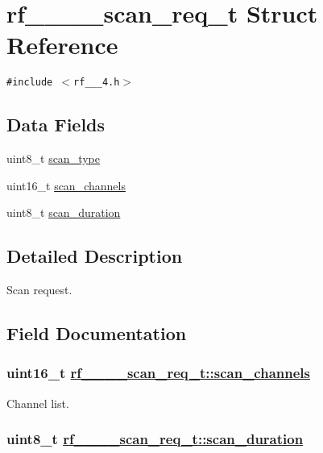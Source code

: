 \hypertarget{structrf__802__15__4__scan__req__t}{
\section{rf\_\_\_\_\-scan\_\-req\_\-t Struct Reference}
\label{structrf__802__15__4__scan__req__t}
}
{\tt \#include $<$rf\_\_\_\-4.h$>$}

\subsection*{Data Fields}
\begin{CompactItemize}
\item 
uint8\_\-t \hyperlink{structrf__802__15__4__scan__req__t_a1bd396edfc7bc51c6eaf706c95180a1}{scan\_\-type}
\item 
uint16\_\-t \hyperlink{structrf__802__15__4__scan__req__t_8fe91abc47377e746610fdfc77fe32c4}{scan\_\-channels}
\item 
uint8\_\-t \hyperlink{structrf__802__15__4__scan__req__t_7ece7fa7b4a28db1ba5b3375ab820f82}{scan\_\-duration}
\end{CompactItemize}


\subsection{Detailed Description}
Scan request. 



\subsection{Field Documentation}
\hypertarget{structrf__802__15__4__scan__req__t_8fe91abc47377e746610fdfc77fe32c4}{
\subsubsection[scan\_\-channels]{\setlength{\rightskip}{0pt plus 5cm}uint16\_\-t \hyperlink{structrf__802__15__4__scan__req__t_8fe91abc47377e746610fdfc77fe32c4}{rf\_\_\_\_\-scan\_\-req\_\-t::scan\_\-channels}}}
\label{structrf__802__15__4__scan__req__t_8fe91abc47377e746610fdfc77fe32c4}


Channel list. \hypertarget{structrf__802__15__4__scan__req__t_7ece7fa7b4a28db1ba5b3375ab820f82}{
\subsubsection[scan\_\-duration]{\setlength{\rightskip}{0pt plus 5cm}uint8\_\-t \hyperlink{structrf__802__15__4__scan__req__t_7ece7fa7b4a28db1ba5b3375ab820f82}{rf\_\_\_\_\-scan\_\-req\_\-t::scan\_\-duration}}}
\label{structrf__802__15__4__scan__req__t_7ece7fa7b4a28db1ba5b3375ab820f82}


